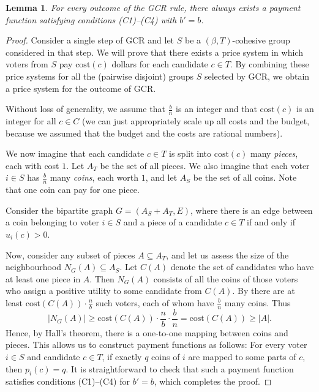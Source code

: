 \documentclass[10pt]{scrartcl}
\renewcommand*{\ge}{\geqslant}
\newcommand{\cost}{{{\mathrm{cost}}}}
\theoremstyle{definition}
\theoremstyle{plain}
\newtheorem{lemma}{Lemma}
\begin{document}
\begin{lemma}\label{lemma-gcr-priceable}
	For every outcome of the GCR rule, there always exists a payment function satisfying conditions (C1)--(C4) with $b'=b$.
\end{lemma}
\begin{proof}
	Consider a single step of GCR and let $S$ be a $(\beta, T)$-cohesive group considered in that step. We will prove that there exists a price system in which voters from $S$ pay $\cost(c)$ dollars for each candidate $c\in T$. By combining these price systems for all the (pairwise disjoint) groups $S$ selected by GCR, we obtain a price system for the  outcome of GCR.


	Without loss of generality, we assume that $\frac{b}{n}$ is an integer and that $\cost(c)$ is an integer for all $c \in C$ (we can just appropriately scale up all costs and the budget, because we assumed that the budget and the costs are rational numbers). 
	
	We now imagine that each candidate $c \in T$ is split into $\cost(c)$ many \emph{pieces}, each with cost $1$. Let $A_T$ be the set of all pieces. We also imagine that each voter $i \in S$ has $\frac{b}{n}$ many \emph{coins}, each worth $1$, and let $A_S$ be the set of all coins. Note that one coin can pay for one piece.


	Consider the bipartite graph $G = (A_S + A_T, E)$, where 
there is an edge between a coin belonging to voter $i\in S$ and a piece of a candidate $c\in T$ if and only if $u_i(c) > 0$. 
	
	Now, consider any subset of pieces $A\subseteq A_T$, and let us assess the size of the neighbourhood $N_G(A) \subseteq A_S$. Let $C(A)$ denote the set of candidates who have at least one piece in $A$. Then $N_G(A)$ consists of all the coins of those voters who assign a positive utility to some candidate from $C(A)$. By  there are at least $\cost(C(A)) \cdot \frac{n}{b}$ such voters, each of whom have $\frac{b}{n}$ many coins. Thus
\[
	\textstyle
	|N_G(A)| \ge \cost(C(A)) \cdot \frac{n}{b} \cdot \frac{b}{n} = \cost(C(A))  \ge |A|.
	\]
Hence, by Hall's theorem, there is a one-to-one mapping between coins and pieces. This allows us to construct payment functions as follows:
	For every voter $i\in S$ and candidate $c \in T$, if exactly $q$ coins of $i$ are mapped to some parts of $c$, then $p_i(c) = q$. It is straightforward to check that such a payment function satisfies conditions (C1)--(C4) for $b'=b$, which completes the proof.
\end{proof}
\end{document}
